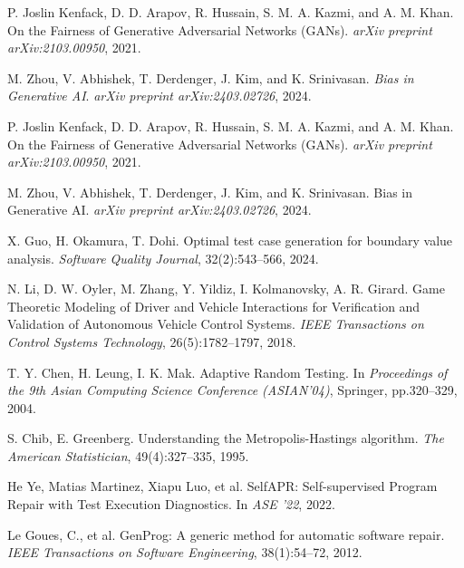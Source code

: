 \documentclass[manuscript,screen,review]{acmart}
\begin{document}
\begin{thebibliography}{99}
P. Joslin Kenfack, D. D. Arapov, R. Hussain, S. M. A. Kazmi, and A. M. Khan.
\newblock On the Fairness of Generative Adversarial Networks (GANs).
\newblock \textit{arXiv preprint arXiv:2103.00950}, 2021.

M. Zhou, V. Abhishek, T. Derdenger, J. Kim, and K. Srinivasan.
\newblock \textit{Bias in Generative AI}.
\newblock \textit{arXiv preprint arXiv:2403.02726}, 2024.



P. Joslin Kenfack, D. D. Arapov, R. Hussain, S. M. A. Kazmi, and A. M. Khan.
\newblock On the Fairness of Generative Adversarial Networks (GANs).
\newblock \textit{arXiv preprint arXiv:2103.00950}, 2021.

M. Zhou, V. Abhishek, T. Derdenger, J. Kim, and K. Srinivasan.
\newblock Bias in Generative AI.
\newblock \textit{arXiv preprint arXiv:2403.02726}, 2024.

X. Guo, H. Okamura, T. Dohi.
\newblock Optimal test case generation for boundary value analysis.
\newblock \textit{Software Quality Journal}, 32(2):543--566, 2024.

N. Li, D. W. Oyler, M. Zhang, Y. Yildiz, I. Kolmanovsky, A. R. Girard.
\newblock Game Theoretic Modeling of Driver and Vehicle Interactions for Verification and Validation of Autonomous Vehicle Control Systems.
\newblock \textit{IEEE Transactions on Control Systems Technology}, 26(5):1782--1797, 2018.

T. Y. Chen, H. Leung, I. K. Mak.
\newblock Adaptive Random Testing.
\newblock In \textit{Proceedings of the 9th Asian Computing Science Conference (ASIAN’04)}, Springer, pp.320--329, 2004.

S. Chib, E. Greenberg.
\newblock Understanding the Metropolis-Hastings algorithm.
\newblock \textit{The American Statistician}, 49(4):327--335, 1995.

He Ye, Matias Martinez, Xiapu Luo, et al.
\newblock SelfAPR: Self-supervised Program Repair with Test Execution Diagnostics.
\newblock In \textit{ASE '22}, 2022.

Le Goues, C., et al.
\newblock GenProg: A generic method for automatic software repair.
\newblock \textit{IEEE Transactions on Software Engineering}, 38(1):54--72, 2012.


\end{thebibliography}
\end{document}
